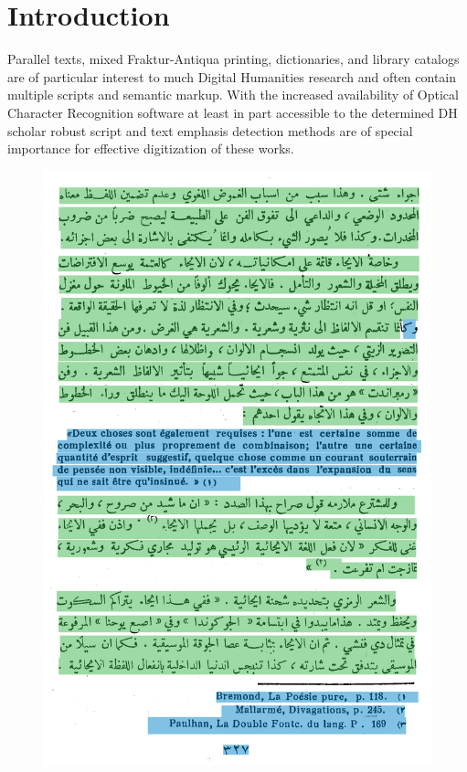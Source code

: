\section{Introduction}

Parallel texts, mixed Fraktur-Antiqua printing, dictionaries, and library
catalogs are of particular interest to much Digital Humanities research
and often contain multiple scripts and semantic markup. With the
increased availability of Optical Character Recognition software at
least in part accessible to the determined DH scholar robust script and
text emphasis detection methods are of special importance for effective
digitization of these works.

\begin{figure}
	\includegraphics[width=\linewidth]{high.png}
	\label{fig:high}
\end{figure}

